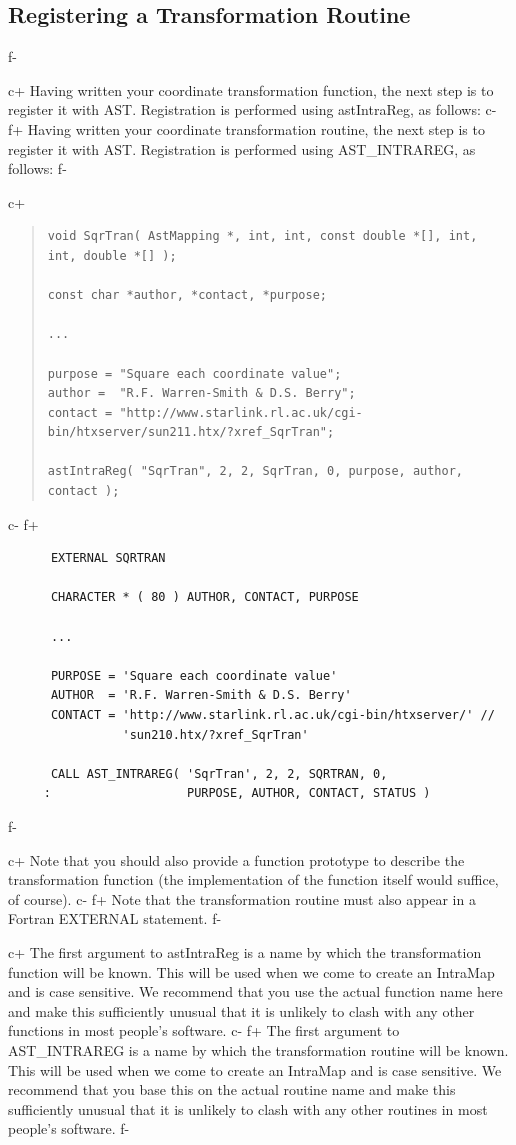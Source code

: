 \documentclass[twoside,11pt]{article}
\begin{document}
\subsection{\label{ss:registeringintramaps}Registering a Transformation Routine}
f-

c+
Having written your coordinate transformation function, the next step
is to register it with AST. Registration is performed using
astIntraReg, as follows:
c-
f+
Having written your coordinate transformation routine, the next step
is to register it with AST. Registration is performed using
AST\_INTRAREG, as follows:
f-

c+
\begin{quote}
\small
\begin{verbatim}
void SqrTran( AstMapping *, int, int, const double *[], int, int, double *[] );

const char *author, *contact, *purpose;

...

purpose = "Square each coordinate value";
author =  "R.F. Warren-Smith & D.S. Berry";
contact = "http://www.starlink.rl.ac.uk/cgi-bin/htxserver/sun211.htx/?xref_SqrTran";

astIntraReg( "SqrTran", 2, 2, SqrTran, 0, purpose, author, contact );
\end{verbatim}
\normalsize
\end{quote}
c-
f+
\small
\begin{verbatim}
      EXTERNAL SQRTRAN

      CHARACTER * ( 80 ) AUTHOR, CONTACT, PURPOSE

      ...

      PURPOSE = 'Square each coordinate value'
      AUTHOR  = 'R.F. Warren-Smith & D.S. Berry'
      CONTACT = 'http://www.starlink.rl.ac.uk/cgi-bin/htxserver/' //
                'sun210.htx/?xref_SqrTran'

      CALL AST_INTRAREG( 'SqrTran', 2, 2, SQRTRAN, 0,
     :                   PURPOSE, AUTHOR, CONTACT, STATUS )
\end{verbatim}
\normalsize
f-

c+
Note that you should also provide a function prototype to describe the
transformation function (the implementation of the function itself
would suffice, of course).
c-
f+
Note that the transformation routine must also appear in a Fortran
EXTERNAL statement.
f-

c+
The first argument to astIntraReg is a name by which the
transformation function will be known. This will be used when we come
to create an IntraMap and is case sensitive. We recommend that you use
the actual function name here and make this sufficiently unusual that
it is unlikely to clash with any other functions in most people's
software.
c-
f+
The first argument to AST\_INTRAREG is a name by which the
transformation routine will be known. This will be used when we come
to create an IntraMap and is case sensitive. We recommend that you
base this on the actual routine name and make this sufficiently
unusual that it is unlikely to clash with any other routines in most
people's software.
f-
\end{document}

